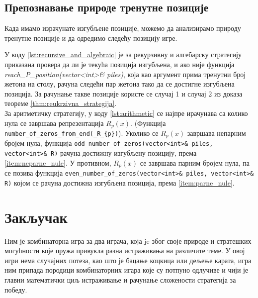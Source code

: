 \documentclass[a4paper]{article}
\begin{document}
\subsection{Препознавање природе тренутне позиције}

Када имамо израчунате изгубљене позиције, можемо да анализирамо природу тренутне позиције и да одредимо следећу позицију игре.

У коду \ref{lst:recursive_and_algebraic} је за рекурзивну и алгебарску стратегију приказана провера да ли је текућа позиција изгубљена, и ако није функција \textit{reach\_P\_position(vector<int>\& piles)}, која као аргумент прима тренутни број жетона на столу, рачуна следећи пар жетона тако да се достигне изгубљена позиција. За рачунање такве позиције користе се случај 1 и случај 2 из доказа теореме \ref{thm:reukrzivna_strategija}.\\
За аритметичку стратегију, у коду \ref{lst:arithmetic} се најпре ирачунава са колико нула се завршава репрезентација $ R_{p}(x) $. (Функција \verb|number_of_zeros_from_end(_R_{p})|). Уколико се $ R_{p}(x) $ завршава непарним бројем нула, функција \verb|odd_number_of_zeros(vector<int>& piles, vector<int>& R)| рачуна достижну изгубљену позицију, према \ref{item:neparne_nule}. У противном, $ R_{p}(x) $ се завршава парним бројем нула, па се позива функција \verb|even_number_of_zeros(vector<int>& piles, vector<int>& R)| којом се рачуна достижна изгубљена позиција, према \ref{item:parne_nule}.





\newpage

\section{Закључак}
\label{sec:zakljucak}

Ним је комбинаторна игра за два играча, која je због своје природе и стратешких могућности које пружа привукла разна истраживања на различите теме. У овој игри нема случајних потеза, као што је бацање коцкица или дељење карата, игра ним припада породици комбинаторних игара које су потпуно одлучиве и чији је главни математички циљ истраживање и рачунање сложености стратегија за победу.
\end{document}
